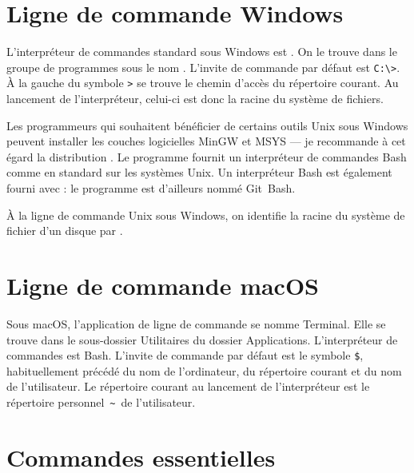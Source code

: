 \section{Ligne de commande Windows}
\label{sec:cli:windows}

L'interpréteur de commandes standard sous Windows est
. On le trouve dans le groupe
de programmes  sous le nom . L'invite de commande par défaut est \verb=C:\>=. À la
gauche du symbole \verb=>= se trouve le chemin d'accès du répertoire
courant. Au lancement de l'interpréteur, celui-ci est donc la racine
du système de fichiers.

Les programmeurs qui souhaitent bénéficier de certains outils
Unix sous Windows peuvent installer les couches
logicielles MinGW et MSYS --- je recommande à
cet égard la distribution
. Le programme
 fournit un interpréteur de commandes Bash
\citep{bash} comme en standard sur les systèmes Unix. Un interpréteur
Bash est également fourni avec 
: le programme
est d'ailleurs nommé Git~Bash.

À la ligne de commande Unix sous Windows, on identifie la
racine  du système de fichier d'un disque par .


\section{Ligne de commande macOS}
\label{sec:cli:macos}

Sous macOS, l'application de ligne de commande se nomme
Terminal. Elle se trouve dans le sous-dossier
Utilitaires du dossier Applications. L'interpréteur de commandes est
Bash. L'invite de commande par défaut est le symbole
\verb=$=, habituellement précédé du nom de l'ordinateur, du répertoire
courant et du nom de l'utilisateur. Le répertoire courant au lancement
de l'interpréteur est le répertoire personnel \,\verb=~=\, de
l'utilisateur.



\section{Commandes essentielles}
\label{sec:cli:commandes}

